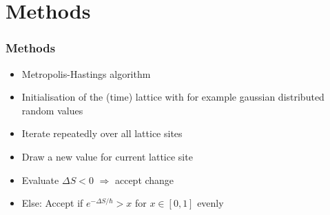\documentclass[aspectratio=169]{beamer}
\begin{document}
\section{Methods}
\begin{frame}
	\frametitle{Methods}
	\begin{itemize}
		\item Metropolis-Hastings algorithm
		\item Initialisation of the (time) lattice with for example gaussian distributed random values
		\item Iterate repeatedly over all lattice sites
		\item Draw a new value for current lattice site
		\item Evaluate $\Delta S < 0$ $\Rightarrow$ accept change
		\item Else: Accept if $e^{-\Delta S / \hbar} > x$ for $x \in [0, 1]$ evenly
	\end{itemize}
\end{frame}
\end{document}
